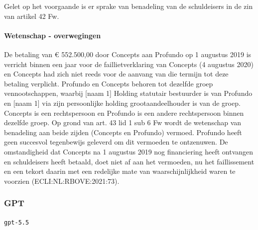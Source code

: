 \documentclass[
  dutch,
  a4paper,
]{article}
\begin{document}
Gelet op het voorgaande is er sprake van benadeling van de schuldeisers in de zin van artikel 42 Fw.

\paragraph{Wetenschap - overwegingen}\label{wetenschap---overwegingen-42}

De betaling van € 552.500,00 door Concepts aan Profundo op 1 augustus 2019 is verricht binnen een jaar voor de faillietverklaring van Concepts (4 augustus 2020) en Concepts had zich niet reeds voor de aanvang van die termijn tot deze betaling verplicht. Profundo en Concepts behoren tot dezelfde groep vennootschappen, waarbij {[}naam 1{]} Holding statutair bestuurder is van Profundo en {[}naam 1{]} via zijn persoonlijke holding grootaandeelhouder is van de groep. Concepts is een rechtspersoon en Profundo is een andere rechtspersoon binnen dezelfde groep. Op grond van art. 43 lid 1 sub 6 Fw wordt de wetenschap van benadeling aan beide zijden (Concepts en Profundo) vermoed. Profundo heeft geen succesvol tegenbewijs geleverd om dit vermoeden te ontzenuwen. De omstandigheid dat Concepts na 1 augustus 2019 nog financiering heeft ontvangen en schuldeisers heeft betaald, doet niet af aan het vermoeden, nu het faillissement en een tekort daarin met een redelijke mate van waarschijnlijkheid waren te voorzien (ECLI:NL:RBOVE:2021:73).

\newpage


\subsubsection{GPT}\label{gpt-14}

\texttt{gpt-5.5}
\end{document}
